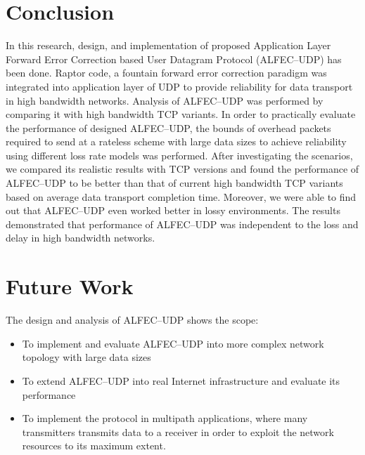 
\section{Conclusion}
In this research, design, and implementation of proposed Application Layer Forward Error Correction based User Datagram Protocol (ALFEC--UDP) has been done. Raptor code, a fountain forward error correction paradigm was integrated into application layer of UDP to provide reliability for data transport in high bandwidth networks. Analysis of ALFEC--UDP was performed by comparing it with high bandwidth TCP variants.
In order to practically evaluate the performance of designed ALFEC--UDP, the bounds of overhead packets required to send at a rateless scheme with large data sizes to achieve reliability using different loss rate models was performed. After investigating the scenarios, we compared its realistic results with TCP versions and found the performance of ALFEC--UDP to be better than that of current high bandwidth TCP variants based on average data transport completion time. Moreover, we were able to find out that ALFEC--UDP even worked better in lossy environments. The results demonstrated that performance of ALFEC--UDP was independent to the loss and delay in high bandwidth networks. 
\newpage
\section{Future Work}
The design and analysis of ALFEC--UDP shows the scope:
\begin{itemize}
\item To implement and evaluate ALFEC--UDP into more complex network topology with large data sizes
\item To extend ALFEC--UDP into real Internet infrastructure and evaluate its performance
\item To implement the protocol in multipath applications, where many transmitters transmits data to a receiver in order to exploit the network resources to its maximum extent.

\end{itemize}